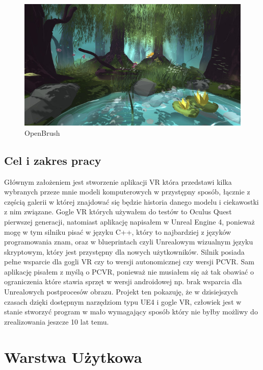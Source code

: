 \documentclass[a4paper,12pt,reqno]{article}
\begin{document}
\begin{figure}[H]%
\centering
\includegraphics[width=0.8\columnwidth]{graphics/OpenBrush.png}
\caption{OpenBrush
\label{OpenBrush}}%
%
\qquad
\end{figure}  

\subsection{Cel i zakres pracy}

Głównym założeniem jest stworzenie aplikacji VR która przedstawi kilka wybranych
przeze mnie modeli komputerowych w przystępny sposób, łącznie z częścią galerii w
której znajdować się będzie historia danego modelu i ciekawostki z nim związane.
Gogle VR których używałem do testów to Oculus Quest pierwszej generacji,
natomiast aplikację napisałem w Unreal Engine 4, ponieważ mogę w tym silniku
pisać w języku C++, który to najbardziej z języków programowania znam, oraz w
blueprintach czyli Unrealowym wizualnym języku skryptowym, który jest przystępny
dla nowych użytkowników. Silnik posiada pełne wsparcie dla gogli VR czy to wersji
autonomicznej czy wersji PCVR. Sam aplikację pisałem z myślą o PCVR, ponieważ
nie musiałem się aż tak obawiać o ograniczenia które stawia sprzęt w wersji
androidowej np. brak wsparcia dla Unrealowych postprocesów obrazu. Projekt ten
pokazuję, że w dzisiejszych czasach dzięki dostępnym narzędziom typu UE4 i gogle
VR, człowiek jest w stanie stworzyć program w mało wymagający sposób który nie
byłby możliwy do zrealizowania jeszcze 10 lat temu.

\newpage
\section{Warstwa Użytkowa}
\end{document}
